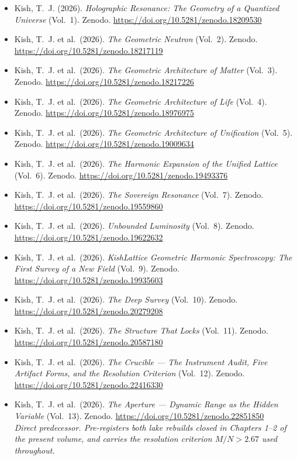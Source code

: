 \documentclass[11pt, letterpaper, openany]{book}
\begin{document}
\begin{itemize}
    \item Kish, T.~J. (2026). \textit{Holographic Resonance: The Geometry of a Quantized Universe}
          (Vol.~1). Zenodo. \url{https://doi.org/10.5281/zenodo.18209530}
    \item Kish, T.~J. et al.\ (2026). \textit{The Geometric Neutron} (Vol.~2).
          Zenodo. \url{https://doi.org/10.5281/zenodo.18217119}
    \item Kish, T.~J. et al.\ (2026). \textit{The Geometric Architecture of Matter} (Vol.~3).
          Zenodo. \url{https://doi.org/10.5281/zenodo.18217226}
    \item Kish, T.~J. et al.\ (2026). \textit{The Geometric Architecture of Life} (Vol.~4).
          Zenodo. \url{https://doi.org/10.5281/zenodo.18976975}
    \item Kish, T.~J. et al.\ (2026). \textit{The Geometric Architecture of Unification} (Vol.~5).
          Zenodo. \url{https://doi.org/10.5281/zenodo.19009634}
    \item Kish, T.~J. et al.\ (2026). \textit{The Harmonic Expansion of the Unified Lattice}
          (Vol.~6). Zenodo. \url{https://doi.org/10.5281/zenodo.19493376}
    \item Kish, T.~J. et al.\ (2026). \textit{The Sovereign Resonance} (Vol.~7).
          Zenodo. \url{https://doi.org/10.5281/zenodo.19559860}
    \item Kish, T.~J. et al.\ (2026). \textit{Unbounded Luminosity} (Vol.~8).
          Zenodo. \url{https://doi.org/10.5281/zenodo.19622632}
    \item Kish, T.~J. et al.\ (2026). \textit{KishLattice Geometric Harmonic Spectroscopy: The First
          Survey of a New Field} (Vol.~9). Zenodo. \url{https://doi.org/10.5281/zenodo.19935603}
    \item Kish, T.~J. et al.\ (2026). \textit{The Deep Survey} (Vol.~10).
          Zenodo. \url{https://doi.org/10.5281/zenodo.20279208}
    \item Kish, T.~J. et al.\ (2026). \textit{The Structure That Locks} (Vol.~11).
          Zenodo. \url{https://doi.org/10.5281/zenodo.20587180}
    \item Kish, T.~J. et al.\ (2026). \textit{The Crucible --- The Instrument Audit, Five Artifact
          Forms, and the Resolution Criterion} (Vol.~12).
          Zenodo. \url{https://doi.org/10.5281/zenodo.22416330}
    \item Kish, T.~J. et al.\ (2026). \textit{The Aperture --- Dynamic Range as the Hidden Variable}
          (Vol.~13). Zenodo. \url{https://doi.org/10.5281/zenodo.22851850}
          \\ \textit{Direct predecessor. Pre-registers both lake rebuilds closed in Chapters 1--2 of
          the present volume, and carries the resolution criterion $M/N > 2.67$ used throughout.}
\end{itemize}
\end{document}
